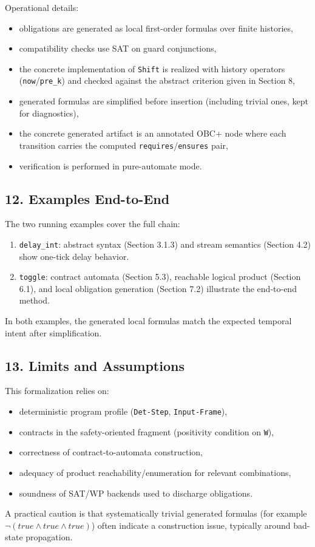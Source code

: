 \documentclass[
]{article}
\providecommand{\tightlist}{%
  \setlength{\itemsep}{0pt}\setlength{\parskip}{0pt}}
\begin{document}
Operational details:

\begin{itemize}
\tightlist
\item
  obligations are generated as local first-order formulas over finite
  histories,
\item
  compatibility checks use SAT on guard conjunctions,
\item
  the concrete implementation of \texttt{Shift} is realized with history
  operators (\texttt{now}/\texttt{pre\_k}) and checked against the
  abstract criterion given in Section 8,
\item
  generated formulas are simplified before insertion (including trivial
  ones, kept for diagnostics),
\item
  the concrete generated artifact is an annotated OBC+ node where each
  transition carries the computed \texttt{requires}/\texttt{ensures}
  pair,
\item
  verification is performed in pure-automate mode.
\end{itemize}

\subsection{12. Examples End-to-End}\label{examples-end-to-end}

The two running examples cover the full chain:

\begin{enumerate}
\def\labelenumi{\arabic{enumi}.}
\tightlist
\item
  \texttt{delay\_int}: abstract syntax (Section 3.1.3) and stream
  semantics (Section 4.2) show one-tick delay behavior.
\item
  \texttt{toggle}: contract automata (Section 5.3), reachable logical
  product (Section 6.1), and local obligation generation (Section 7.2)
  illustrate the end-to-end method.
\end{enumerate}

In both examples, the generated local formulas match the expected
temporal intent after simplification.

\subsection{13. Limits and Assumptions}\label{limits-and-assumptions}

This formalization relies on:

\begin{itemize}
\tightlist
\item
  deterministic program profile (\texttt{Det-Step},
  \texttt{Input-Frame}),
\item
  contracts in the safety-oriented fragment (positivity condition on
  \texttt{W}),
\item
  correctness of contract-to-automata construction,
\item
  adequacy of product reachability/enumeration for relevant
  combinations,
\item
  soundness of SAT/WP backends used to discharge obligations.
\end{itemize}

A practical caution is that systematically trivial generated formulas
(for example \(\neg(true\land true\land true)\)) often indicate a
construction issue, typically around bad-state propagation.
\end{document}
